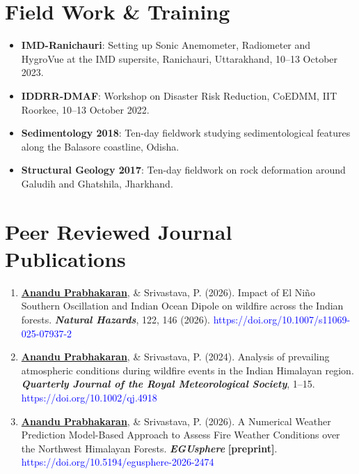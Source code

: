 \documentclass[letterpaper,11pt]{article}
\newcommand{\resumeItem}[1]{
  \item\small{
    {\justifying #1 \vspace{-2pt}}
  }
}
\newcommand{\resumeItemListStart}{\begin{itemize}[itemsep=1pt,parsep=0pt,topsep=2pt]}
\newcommand{\resumeItemListEnd}{\end{itemize}\vspace{-5pt}}
\begin{document}
\section{Field Work \& Training}
      \resumeItemListStart
        \resumeItem{\textbf{IMD-Ranichauri}: Setting up Sonic Anemometer, Radiometer and HygroVue at the IMD supersite, Ranichauri, Uttarakhand, 10--13 October 2023.}
        \resumeItem{\textbf{IDDRR-DMAF}: Workshop on Disaster Risk Reduction, CoEDMM, IIT Roorkee, 10--13 October 2022.}
        \resumeItem{\textbf{Sedimentology 2018}: Ten-day fieldwork studying sedimentological features along the Balasore coastline, Odisha.}
        \resumeItem{\textbf{Structural Geology 2017}: Ten-day fieldwork on rock deformation around Galudih and Ghatshila, Jharkhand.}
      \resumeItemListEnd
\vspace{-0.15cm}

\section{Peer Reviewed Journal Publications}
\vspace{-5pt}
\begin{justify}
\begin{enumerate}[leftmargin=*]

    \item \underline{\textbf{Anandu Prabhakaran}}, \& Srivastava, P. (2026). Impact of El Ni\~no Southern Oscillation and Indian Ocean Dipole on wildfire across the Indian forests. \textbf{\textit{Natural Hazards}}, 122, 146 (2026). \textcolor{blue}{https://doi.org/10.1007/s11069-025-07937-2}
    \vspace{0.12cm}

    \item \underline{\textbf{Anandu Prabhakaran}}, \& Srivastava, P. (2024). Analysis of prevailing atmospheric conditions during wildfire events in the Indian Himalayan region. \textbf{\textit{Quarterly Journal of the Royal Meteorological Society}}, 1--15. \textcolor{blue}{https://doi.org/10.1002/qj.4918}
    \vspace{0.12cm}

    \item \underline{\textbf{Anandu Prabhakaran}}, \& Srivastava, P. (2026). A Numerical Weather Prediction Model-Based Approach to Assess Fire Weather Conditions over the Northwest Himalayan Forests. \textbf{\textit{EGUsphere}} \textbf{[preprint]}. \textcolor{blue}{https://doi.org/10.5194/egusphere-2026-2474}
    \vspace{0.12cm}

\end{enumerate}
\end{justify}
\vspace{-0.15cm}
\end{document}
